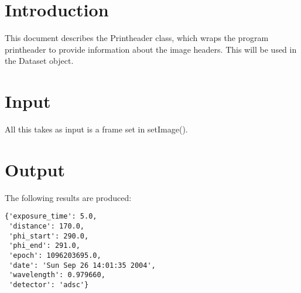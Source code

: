 \documentclass[a4paper, 11pt]{article}
\begin{document}
\section{Introduction}

This document describes the Printheader class, which wraps the program 
printheader to provide information about the image headers. This will
be used in the Dataset object.

\section{Input}

All this takes as input is a frame set in setImage().

\section{Output}

The following results are produced:

{
\small
\begin{verbatim}
{'exposure_time': 5.0, 
 'distance': 170.0, 
 'phi_start': 290.0, 
 'phi_end': 291.0, 
 'epoch': 1096203695.0, 
 'date': 'Sun Sep 26 14:01:35 2004', 
 'wavelength': 0.979660, 
 'detector': 'adsc'}
\end{verbatim}
}
\end{document}
